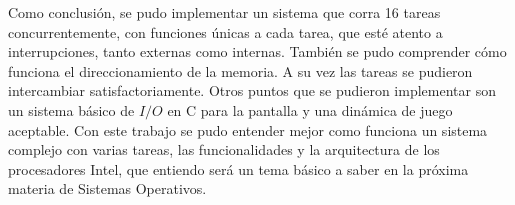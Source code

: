 Como conclusión, se pudo implementar un sistema que corra 16 tareas concurrentemente, con funciones únicas a cada tarea, que esté atento a interrupciones, tanto externas como internas. También se pudo comprender cómo funciona el direccionamiento de la memoria. A su vez las tareas se pudieron intercambiar satisfactoriamente. Otros puntos que se pudieron implementar son un sistema básico de $I/O$ en C para la pantalla y una dinámica de juego aceptable. Con este trabajo se pudo entender mejor como funciona un sistema complejo con varias tareas, las funcionalidades y la arquitectura de los procesadores Intel, que entiendo será un tema básico a saber en la próxima materia de Sistemas Operativos. 